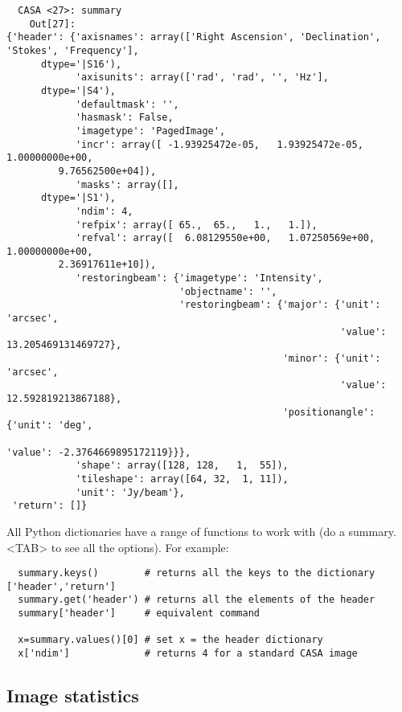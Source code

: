 \small
\begin{verbatim}
  CASA <27>: summary
    Out[27]: 
{'header': {'axisnames': array(['Right Ascension', 'Declination', 'Stokes', 'Frequency'], 
      dtype='|S16'),
            'axisunits': array(['rad', 'rad', '', 'Hz'], 
      dtype='|S4'),
            'defaultmask': '',
            'hasmask': False,
            'imagetype': 'PagedImage',
            'incr': array([ -1.93925472e-05,   1.93925472e-05,   1.00000000e+00,
         9.76562500e+04]),
            'masks': array([], 
      dtype='|S1'),
            'ndim': 4,
            'refpix': array([ 65.,  65.,   1.,   1.]),
            'refval': array([  6.08129550e+00,   1.07250569e+00,   1.00000000e+00,
         2.36917611e+10]),
            'restoringbeam': {'imagetype': 'Intensity',
                              'objectname': '',
                              'restoringbeam': {'major': {'unit': 'arcsec',
                                                          'value': 13.205469131469727},
                                                'minor': {'unit': 'arcsec',
                                                          'value': 12.592819213867188},
                                                'positionangle': {'unit': 'deg',
                                                                  'value': -2.3764669895172119}}},
            'shape': array([128, 128,   1,  55]),
            'tileshape': array([64, 32,  1, 11]),
            'unit': 'Jy/beam'},
 'return': []}
\end{verbatim}
\normalsize


All Python dictionaries have a range of functions to work with (do a
summary.<TAB> to see all the options). For example:


\small
\begin{verbatim}
  summary.keys()        # returns all the keys to the dictionary ['header','return']
  summary.get('header') # returns all the elements of the header
  summary['header']     # equivalent command

  x=summary.values()[0] # set x = the header dictionary
  x['ndim']             # returns 4 for a standard CASA image 
\end{verbatim}
\normalsize

\subsection{Image statistics}
\label{subsection:image.stats}

